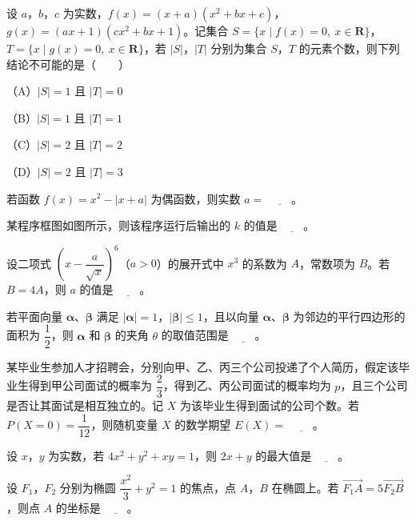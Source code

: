 \begin{question}
设 $a$，$b$，$c$ 为实数，$f(x)=(x+a)(x^2+bx+c)$，$g(x)=(ax+1)(cx^2+bx+1)$。记集合 $S=\{x\mid f(x)=0,\ x\in\mathbf R\}$，$T=\{x\mid g(x)=0,\ x\in\mathbf R\}$，若 $|S|$，$|T|$ 分别为集合 $S$，$T$ 的元素个数，则下列结论不可能的是\mbox{（　　）}

（A）$|S|=1$ 且 $|T|=0$

（B）$|S|=1$ 且 $|T|=1$

（C）$|S|=2$ 且 $|T|=2$

（D）$|S|=2$ 且 $|T|=3$

\end{question}

\begin{question}
若函数 $f(x)=x^2-|x+a|$ 为偶函数，则实数 $a=$ $\underline{\qquad}$。

\Needspace{0.4\textheight}
\end{question}
\begin{question}
某程序框图如图所示，则该程序运行后输出的 $k$ 的值是 $\underline{\qquad}$。
\nopagebreak[4]
\begin{center}\end{center}
\nopagebreak[4]
\end{question}
\begin{question}
设二项式 $\left(x-\dfrac{a}{\sqrt x}\right)^6$（$a>0$）的展开式中 $x^3$ 的系数为 $A$，常数项为 $B$。若 $B=4A$，则 $a$ 的值是 $\underline{\qquad}$。

\end{question}
\begin{question}
若平面向量 $\boldsymbol\alpha$、$\boldsymbol\beta$ 满足 $|\boldsymbol\alpha|=1$，$|\boldsymbol\beta|\leqslant1$，且以向量 $\boldsymbol\alpha$、$\boldsymbol\beta$ 为邻边的平行四边形的面积为 $\dfrac12$，则 $\boldsymbol\alpha$ 和 $\boldsymbol\beta$ 的夹角 $\theta$ 的取值范围是 $\underline{\qquad}$。

\end{question}
\begin{question}
某毕业生参加人才招聘会，分别向甲、乙、丙三个公司投递了个人简历，假定该毕业生得到甲公司面试的概率为 $\dfrac23$，得到乙、丙公司面试的概率均为 $p$，且三个公司是否让其面试是相互独立的。记 $X$ 为该毕业生得到面试的公司个数。若 $P(X=0)=\dfrac1{12}$，则随机变量 $X$ 的数学期望 $E(X)=$ $\underline{\qquad}$。

\end{question}
\begin{question}
设 $x$，$y$ 为实数，若 $4x^2+y^2+xy=1$，则 $2x+y$ 的最大值是 $\underline{\qquad}$。

\end{question}
\begin{question}
设 $F_1$，$F_2$ 分别为椭圆 $\dfrac{x^2}3+y^2=1$ 的焦点，点 $A$，$B$ 在椭圆上。若 $\overrightarrow{F_1A}=5\overrightarrow{F_2B}$，则点 $A$ 的坐标是 $\underline{\qquad}$。

\end{question}

